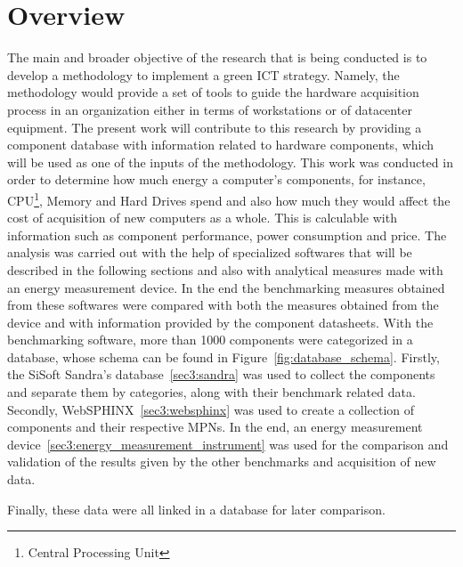 \section{Overview} \label{sec3:overview}
    The main and broader objective of the research that is being conducted is to develop a methodology to implement a green ICT strategy. Namely, the methodology would provide a set of tools to guide the hardware acquisition process in an organization either in terms of workstations or of datacenter equipment. The present work will contribute to this research by providing a component database with information related to hardware components, which will be used as one of the inputs of the methodology. This work was conducted in order to determine how much energy a computer's components, for instance, CPU\footnote{Central Processing Unit}, Memory and Hard Drives spend and also how much they would affect the cost of acquisition of new computers as a whole. This is calculable with information such as component performance, power consumption and price. The analysis was carried out with the help of specialized softwares that will be described in the following sections and also with analytical measures made with an energy measurement device. In the end the benchmarking measures obtained from these softwares were compared with both the measures obtained from the device and with information provided by the component datasheets. With the benchmarking software, more than 1000 components were categorized in a database, whose schema can be found in Figure~\ref{fig:database_schema}. Firstly, the SiSoft Sandra's database~\ref{sec3:sandra} was used to collect the components and separate them by categories, along with their benchmark related data. Secondly, WebSPHINX~\ref{sec3:websphinx} was used to create a collection of components and their respective MPNs. In the end, an energy measurement device~\ref{sec3:energy_measurement_instrument} was used for the comparison and validation of the results given by the other benchmarks and acquisition of new data. 

    Finally, these data were all linked in a database for later comparison. 

